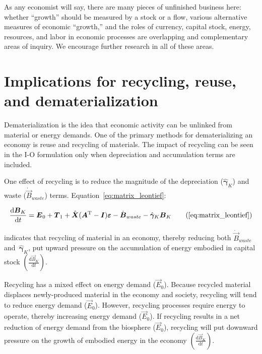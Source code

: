 As any economist will say, 
there are many pieces of unfinished business here:
whether ``growth'' should be measured by a stock or a flow, 
various alternative measures of economic ``growth,'' 
and the roles of currency, capital stock, energy, resources, and labor
in economic processes
are overlapping and complementary areas of inquiry.
We encourage further research in all of these areas.


\section{Implications for recycling, reuse, and dematerialization}

Dematerialization is the idea that economic activity can be unlinked 
from material or energy demands.\cite{FischerKowalski:2011uo} 
One of the primary methods for dematerializing an economy 
is reuse and recycling of materials. 
The impact of recycling can be seen in the I-O formulation 
only when depreciation and accumulation terms are included. 

One effect of recycling is to reduce the magnitude 
of the depreciation ($\hat{\bm{\gamma}}_{K}$)
and waste ($\dot{\vec{B}}_{waste}$) terms. 
Equation~\ref{eq:matrix_leontief}:

\begin{equation} \label{eq:matrix_leontief}
	\frac{\mathrm{d}\vec{B}_{K}}{\mathrm{d}t} 
	= \vec{E}_{0}
	+ \vec{T}_{1}
	+ \hat{\vec{X}} (\vec{A}^{\mathrm{T}} - \vec{I})\bm{\varepsilon} 
	- \dot{\vec{B}}_{waste}
	- \hat{\bm{\gamma}}_{K}\vec{B}_{K}\tag{\ref{eq:matrix_leontief}}
\end{equation}

\noindent{}indicates that 
recycling of material in an economy, 
thereby reducing both $\dot{\vec{B}}_{waste}$ 
and~$\hat{\bm{\gamma}}_{K}$, 
put upward pressure on the accumulation of energy embodied 
in capital stock
$\left(\frac{\mathrm{d}\vec{B}_{K}}{\mathrm{d}t}\right)$. 

Recycling has a mixed effect on energy demand ($\vec{E}_{0}$). 
Because recycled material displaces newly-produced material 
in the economy and society, 
recycling will tend to reduce energy demand ($\vec{E}_{0}$). 
However, recycling processes require energy to operate, 
thereby increasing energy demand ($\vec{E}_{0}$). 
If recycling results in a net reduction of energy demand 
from the biosphere ($\vec{E}_{0}$), 
recycling will put downward pressure on the growth 
of embodied energy in the economy
$\left(\frac{\mathrm{d}\vec{B}_{K}}{\mathrm{d}t}\right)$. 

